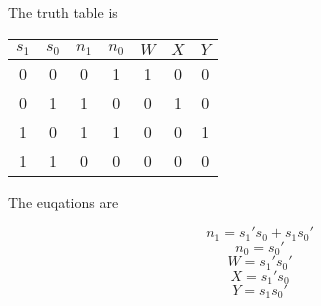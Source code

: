 The truth table is 

\begin{center}
\begin{tabular}{cc|ccccc}
$s_{1}$ & $s_{0}$ & $n_{1}$ & $n_{0}$ & $W$ & $X$ & $Y$ \\
\hline
0 & 0 & 0 & 1 & 1 & 0 & 0 \\
0 & 1 & 1 & 0 & 0 & 1 & 0 \\
1 & 0 & 1 & 1 & 0 & 0 & 1 \\
1 & 1 & 0 & 0 & 0 & 0 & 0 \\
\end{tabular}
\end{center}

The euqations are 

$$n_{1}=s_{1}'s_{0}+s_{1}s_{0}'$$
$$n_{0}=s_{0}'$$
$$W=s_{1}'s_{0}'$$
$$X=s_{1}'s_{0}$$
$$Y=s_{1}s_{0}'$$


